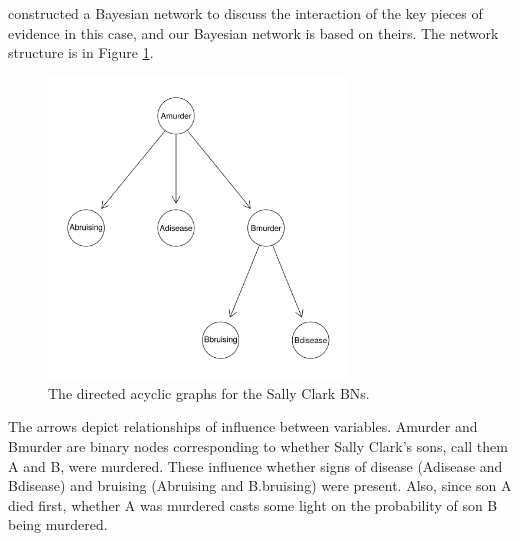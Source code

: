\documentclass[10pt,]{scrartcl}
\begin{document}
    














\citet{Fenton2018Risk} constructed a Bayesian network to discuss the interaction of the key pieces of evidence in this case, and our Bayesian network is based on theirs.  The network structure is in Figure \ref{fig:sc}.


\begin{figure}
\centering 
    \includegraphics[width = 8cm]{../images/scFullDAG.png}
    \caption{The directed acyclic graphs for the Sally Clark BNs. }
    \label{fig:sc}
\end{figure}



The  arrows  depict  relationships  of  influence  between  variables. \textsf{Amurder} and \textsf{Bmurder} are binary nodes corresponding to whether Sally  Clark’s  sons,   call  them A and B, were murdered. These  influence  whether  signs of disease (\textsf{Adisease} and \textsf{Bdisease}) and bruising (\textsf{Abruising} and \textsf{B.bruising}) were present. Also, since  son A died first, whether A was murdered casts some light on the probability of son B being murdered.
\end{document}
